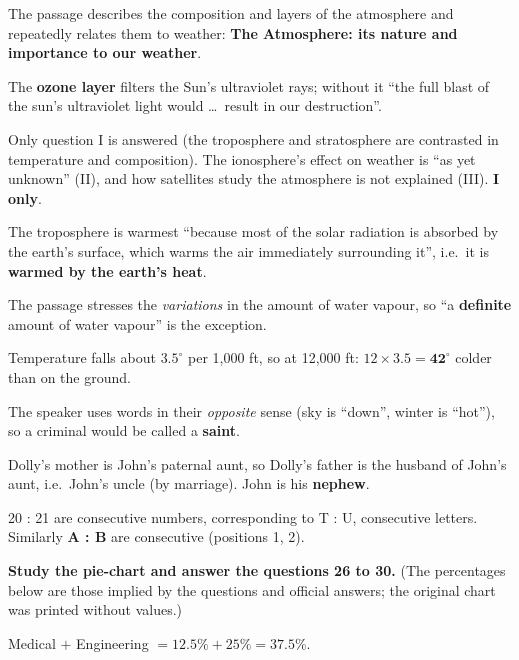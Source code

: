 The passage describes the composition and layers of the atmosphere and repeatedly relates them to weather: \textbf{The Atmosphere: its nature and importance to our weather}.

The \textbf{ozone layer} filters the Sun's ultraviolet rays; without it ``the full blast of the sun's ultraviolet light would \ldots\ result in our destruction''.

Only question I is answered (the troposphere and stratosphere are contrasted in temperature and composition). The ionosphere's effect on weather is ``as yet unknown'' (II), and how satellites study the atmosphere is not explained (III). \textbf{I only}.

The troposphere is warmest ``because most of the solar radiation is absorbed by the earth's surface, which warms the air immediately surrounding it'', i.e.\ it is \textbf{warmed by the earth's heat}.

The passage stresses the \emph{variations} in the amount of water vapour, so ``a \textbf{definite} amount of water vapour'' is the exception.

Temperature falls about $3.5^\circ$ per 1,000 ft, so at 12,000 ft: $12\times3.5=\mathbf{42}^\circ$ colder than on the ground.

The speaker uses words in their \emph{opposite} sense (sky is ``down'', winter is ``hot''), so a criminal would be called a \textbf{saint}.

Dolly's mother is John's paternal aunt, so Dolly's father is the husband of John's aunt, i.e.\ John's uncle (by marriage). John is his \textbf{nephew}.

20 : 21 are consecutive numbers, corresponding to T : U, consecutive letters. Similarly \textbf{A : B} are consecutive (positions 1, 2).

\textbf{Study the pie-chart and answer the questions 26 to 30.} (The percentages below are those implied by the questions and official answers; the original chart was printed without values.)
\begin{center}
\end{center}

Medical $+$ Engineering $=12.5\%+25\%=\mathbf{37.5\%}$.

